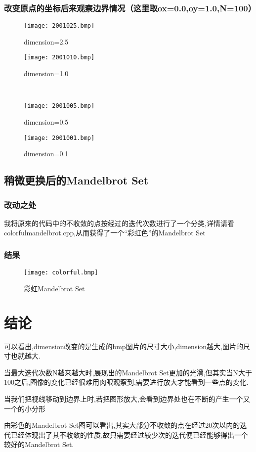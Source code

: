 \documentclass[a4paper]{ctexart}
\begin{document}
\subsubsection{改变原点的坐标后来观察边界情况（这里取ox=0.0,oy=1.0,N=100）}
\begin{figure}[H]
\centering
\begin{minipage}{0.45\textwidth}
\centerline{\texttt{[image: 2001025.bmp]}}
\centerline{dimension=2.5}
\end{minipage}
\begin{minipage}{0.45\textwidth}
\centerline{\texttt{[image: 2001010.bmp]}}
\centerline{dimension=1.0}
\end{minipage}
\\
\begin{minipage}{0.45\textwidth}
\centerline{\texttt{[image: 2001005.bmp]}}
\centerline{dimension=0.5}
\end{minipage}
\begin{minipage}{0.45\textwidth}
\centerline{\texttt{[image: 2001001.bmp]}}
\centerline{dimension=0.1}
\end{minipage}
\end{figure}
\subsection{稍微更换后的Mandelbrot Set}
\subsubsection{改动之处}
我将原来的代码中的不收敛的点按经过的迭代次数进行了一个分类,详情请看colorfulmandelbrot.cpp,从而获得了一个“彩虹色”的Mandelbrot Set

\subsubsection{结果}
\begin{figure}[H]
\centerline{\texttt{[image: colorful.bmp]}}
\centerline{彩虹Mandelbrot Set}
\end{figure}

\section{结论}
可以看出,dimension改变的是生成的bmp图片的尺寸大小,dimension越大,图片的尺寸也就越大.

当最大迭代次数N越来越大时,展现出的Mandelbrot Set更加的光滑,但其实当N大于100之后,图像的变化已经很难用肉眼观察到,需要进行放大才能看到一些点的变化.

当我们把视线移动到边界上时,若把图形放大,会看到边界处也在不断的产生一个又一个的小分形

由彩色的Mnadelbrot Set图可以看出,其实大部分不收敛的点在经过20次以内的迭代已经体现出了其不收敛的性质,故只需要经过较少次的迭代便已经能够得出一个较好的Mandelbrot Set.



\end{document}
